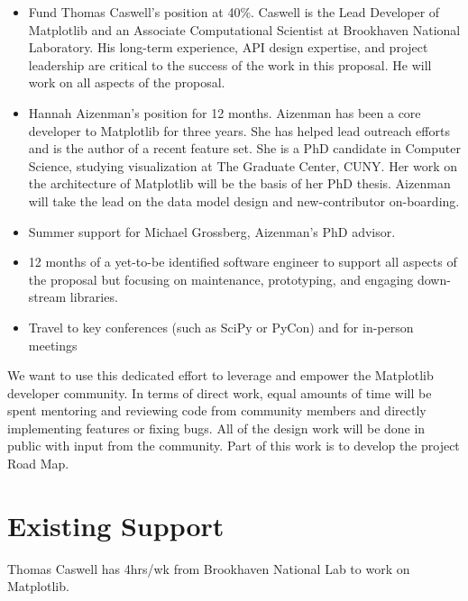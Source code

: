 \documentclass[11pt,letterpaper]{article}  %
\begin{document}
\begin{itemize}[noitemsep]

\item Fund Thomas Caswell's position at 40\%.  Caswell is the Lead Developer of Matplotlib and an Associate
  Computational Scientist at Brookhaven National Laboratory.  His
  long-term experience, API design expertise, and project leadership
  are critical to the success of the work in this proposal.  He will work
  on all aspects of the proposal.
\item Hannah Aizenman's position for 12 months.  Aizenman has
  been a core developer to Matplotlib for three years. She has helped
  lead outreach efforts and is the author of a recent feature set.
  She is a PhD candidate in Computer Science, studying visualization at The
  Graduate Center, CUNY. Her work on the architecture of Matplotlib will be
  the basis of her PhD thesis. Aizenman will take
  the lead on the data model design and new-contributor on-boarding.
\item Summer support for Michael Grossberg, Aizenman's PhD advisor.
\item 12 months of a yet-to-be identified software engineer to support all aspects of the proposal but focusing on maintenance, prototyping, and engaging down-stream libraries.
\item Travel to key conferences (such as SciPy or PyCon) and for in-person meetings
\end{itemize}

We want to use this dedicated effort to leverage and empower the Matplotlib developer community.  In terms of direct work, equal amounts of time will be spent mentoring and reviewing code from community members and directly implementing features or fixing bugs.  All of the design work will be done in public with
input from the community. Part of this work is to develop the project Road Map.



\section{Existing Support}
Thomas Caswell has 4hrs/wk from Brookhaven National Lab to work on Matplotlib.


\clearpage

\end{document}
